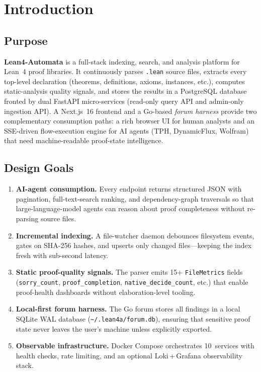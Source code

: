 
\section{Introduction}
\label{sec:introduction}

\subsection{Purpose}

\textbf{Lean4-Automata} is a full-stack indexing, search, and analysis platform
for Lean~4 proof libraries.  It continuously parses \texttt{.lean} source files,
extracts every top-level declaration (theorems, definitions, axioms, instances,
etc.), computes static-analysis quality signals, and stores the results in a
PostgreSQL database fronted by dual FastAPI micro-services (read-only query API
and admin-only ingestion API).  A Next.js~16 frontend and a Go-based
\emph{forum harness} provide two complementary consumption paths: a rich
browser UI for human analysts and an SSE-driven flow-execution engine for
AI agents (TPH, DynamicFlux, Wolfram) that need machine-readable proof-state
intelligence.

\subsection{Design Goals}

\begin{enumerate}
  \item \textbf{AI-agent consumption.}  Every endpoint returns structured JSON
        with pagination, full-text-search ranking, and dependency-graph
        traversals so that large-language-model agents can reason about proof
        completeness without re-parsing source files.
  \item \textbf{Incremental indexing.}  A file-watcher daemon debounces
        filesystem events, gates on SHA-256 hashes, and upserts only changed
        files—keeping the index fresh with sub-second latency.
  \item \textbf{Static proof-quality signals.}  The parser emits 15+
        \texttt{FileMetrics} fields (\texttt{sorry\_count},
        \texttt{proof\_completion}, \texttt{native\_decide\_count}, etc.)
        that enable proof-health dashboards without elaboration-level tooling.
  \item \textbf{Local-first forum harness.}  The Go forum stores all findings
        in a local SQLite WAL database (\texttt{\textasciitilde/.lean4a/forum.db}),
        ensuring that sensitive proof state never leaves the user's machine
        unless explicitly exported.
  \item \textbf{Observable infrastructure.}  Docker Compose orchestrates
        10~services with health checks, rate limiting, and an optional
        Loki\,+\,Grafana observability stack.
\end{enumerate}

